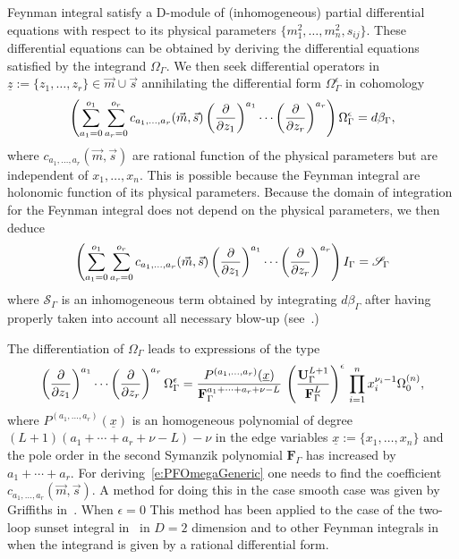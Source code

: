 \documentclass[a4paper,12pt]{article}
\numberwithin{equation}{section}
\numberwithin{figure}{subsection}
\theoremstyle{plain}
\theoremstyle{plain}
\theoremstyle{definition}
\theoremstyle{plain}
\theoremstyle{remark}
\theoremstyle{plain}
\begin{document}
Feynman integral satisfy a D-module of (inhomogeneous) partial
differential equations with respect to its physical parameters
$ \{m_1^2,\dots,m_n^2,s_{ij}\}$.
These differential equations can be obtained by deriving the
differential equations satisfied by the integrand $\Omega_\Gamma$.
We then seek differential operators in $\underline
z:=\{z_1,\dots,z_r\} \in \vec m \cup \vec s$
annihilating the differential form $\Omega_\Gamma^\epsilon$ in cohomology
\begin{equation}\label{e:PFOmegaGeneric}
\left(  \sum_{a_1=0}^{o_1} \sum_{ a_r=0}^{o_r}  c_{a_1,\dots, a_r}(\vec m,\vec s) \left(\partial\over \partial z_1\right)^{a_1}\cdots\left(\partial
  \over\partial z_r\right)^{a_r}  \right)\Omega_\Gamma^\epsilon=d\beta_\Gamma,
\end{equation}
where $  c_{a_1,\dots, a_r}(\vec m,\vec s)$ are rational function of the physical
parameters but are independent of $x_1,\dots,x_n$.  This is possible
because the Feynman integral are holonomic function of its physical parameters.
Because the domain of integration for the Feynman integral does not
depend on the physical parameters, we then deduce
\begin{equation}
  \left( \sum_{a_1=0}^{o_1} \sum_{ a_r=0}^{o_r}  c_{a_1,\dots, a_r}(\vec m,\vec s) \left(\partial\over \partial z_1\right)^{a_1}\cdots\left(\partial
  \over\partial z_r\right)^{a_r}  \right)I_\Gamma=\mathscr{S}_\Gamma
\end{equation}
where $\mathscr{S}_\Gamma$ is an inhomogeneous term obtained by
integrating $d\beta_\Gamma$ after having properly taken into account
all necessary blow-up (see~\cite{bek,Brown:2009ta,Bloch:2016izu,muller2014picard}.)



The    differentiation of $\Omega_\Gamma$ 
leads  to  expressions of the type
\begin{equation}\label{e:PDE}
\left(\partial\over \partial z_1\right)^{a_1}\cdots\left(\partial
  \over\partial z_r\right)^{a_r} \Omega_\Gamma^\epsilon=
{  P^{(a_1,\dots,a_r)}(\underline x)\over \textbf{F}_\Gamma^{a_1+\cdots +a_r+\nu-L}}\,
  \left(\textbf{U}_\Gamma^{L+1}\over \textbf{F}_\Gamma^L\right)^{\epsilon} \, \prod_{i=1}^n x_i^{\nu_i-1} \Omega^{(n)}_0  ,
\end{equation}
where $  P^{(a_1,\dots,a_r)}(\underline x)$ is an
  homogeneous polynomial of degree $(L+1)(a_1+\cdots+a_r+\nu-L)-\nu$ in
 the edge variables $\underline x:=\{x_1,\dots, x_n\}$ and the
  pole order in the second Symanzik polynomial $\textbf{F}_\Gamma$ has increased by
  $a_1+\cdots+a_r$.
  For deriving~\eqref{e:PFOmegaGeneric} one needs to find the
  coefficient $c_{a_1,\dots,a_r}(\vec m,\vec s)$.  A method for doing this in the
  case smooth case was given by Griffiths in~\cite{Griffiths_1969,Dwork_1962,Dwork_1964}.
When $\epsilon=0$ 
This method has been applied to the case of the two-loop sunset
integral in~\cite{Bloch:2016izu} in $D=2$ dimension and to other Feynman
integrals in\cite{Lairez:2022zkj}  when the integrand is given by a rational
differential form.
  
\end{document}
